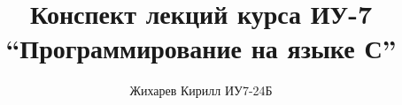 \documentclass[a4paper]{article}
\title{Конспект лекций курса ИУ-7 \\ ``Программирование на языке С''}
\author{Жихарев Кирилл ИУ7-24Б}
\date{ }
\begin{document}
  \maketitle
  \pagebreak

  \tableofcontents
  \pagebreak

  
  
  
  
  
\end{document}
